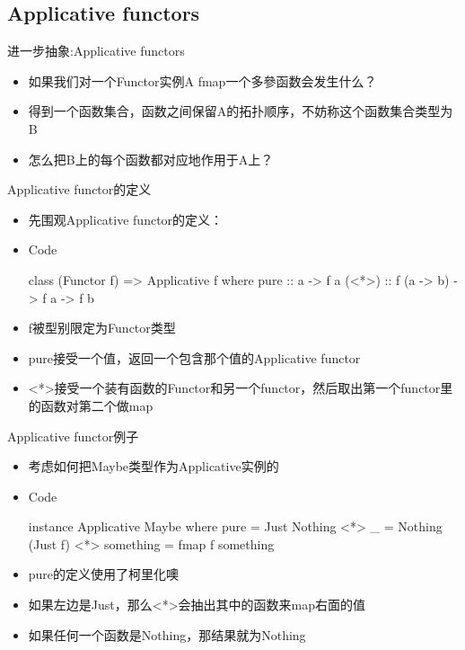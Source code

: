\documentclass[xcolor=dvipsnames, 11pt]{beamer}
\newenvironment{code}{\begin{block}{Code}\begin{semiverbatim} \begin{footnotesize}}{\end{footnotesize}\end{semiverbatim}\end{block}}
\newenvironment{iit}{\begin{itemize}\setlength{\itemsep}{0.2cm}}{\end{itemize}}
\begin{document}
\subsection{Applicative functors}
\begin{frame}[fragile]{进一步抽象:Applicative functors}
\begin{iit}
\item<2->如果我们对一个Functor实例A fmap一个多參函数会发生什么？
\item<3->得到一个函数集合，函数之间保留A的拓扑顺序，不妨称这个函数集合类型为B
\item<4->怎么把B上的每个函数都对应地作用于A上？
\end{iit}
\end{frame}

\begin{frame}[fragile]{Applicative functor的定义}
\begin{iit}
\item<2->先围观Applicative functor的定义：
\item<3->[]\begin{code}
class (Functor f) => Applicative f where   
    pure :: a -> f a   
    (<*>) :: f (a -> b) -> f a -> f b
\end{code}
\item<4->f被型别限定为Functor类型
\item<5->pure接受一个值，返回一个包含那个值的Applicative functor
\item<6-><*>接受一个装有函数的Functor和另一个functor，然后取出第一个functor里的函数对第二个做map
\end{iit}
\end{frame}

\begin{frame}[fragile]{Applicative functor例子}
\begin{iit}
\item<2->考虑如何把Maybe类型作为Applicative实例的
\item<3->[]\begin{code}
instance Applicative Maybe where   
    pure = Just   
    Nothing <*> _ = Nothing   
    (Just f) <*> something = fmap f something
\end{code}
\item<4->pure的定义使用了柯里化噢
\item<5->如果左边是Just，那么<*>会抽出其中的函数来map右面的值
\item<6->如果任何一个函数是Nothing，那结果就为Nothing
\end{iit}
\end{frame}
\end{document}
